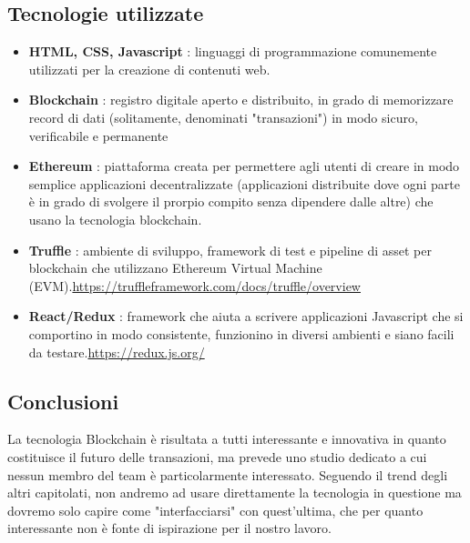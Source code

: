 \documentclass{article}
\begin{document}
	\subsection{Tecnologie utilizzate}
		\begin{itemize}
			\item \textbf{HTML, CSS, Javascript} : linguaggi di programmazione comunemente utilizzati per la creazione di contenuti web.
			\item \textbf{Blockchain} : registro digitale aperto e distribuito, in grado di memorizzare record di dati (solitamente, denominati "transazioni") in modo sicuro, verificabile e permanente
			\item \textbf{Ethereum} : piattaforma creata per permettere agli utenti di creare in modo semplice applicazioni decentralizzate (applicazioni distribuite dove ogni parte è in grado di svolgere il prorpio compito senza dipendere dalle altre) che usano la tecnologia blockchain.
			\item \textbf{Truffle} : ambiente di sviluppo, framework di test e pipeline di asset per blockchain che utilizzano Ethereum Virtual Machine (EVM).\newline \url{https://truffleframework.com/docs/truffle/overview}
			\item \textbf{React/Redux} : framework che aiuta a scrivere applicazioni Javascript che si comportino in modo consistente, funzionino in diversi ambienti e siano facili da testare.\newline \url{https://redux.js.org/}
		\end{itemize}
	\subsection{Conclusioni}
		La tecnologia Blockchain è risultata a tutti interessante e innovativa in quanto costituisce il futuro delle transazioni, ma prevede uno studio dedicato a cui nessun membro del team è particolarmente interessato. Seguendo il trend degli altri capitolati, non andremo ad usare direttamente la tecnologia in questione ma dovremo solo capire come "interfacciarsi" con quest'ultima, che per quanto interessante non è fonte di ispirazione per il nostro lavoro.
\newpage			
									
		
\end{document}
